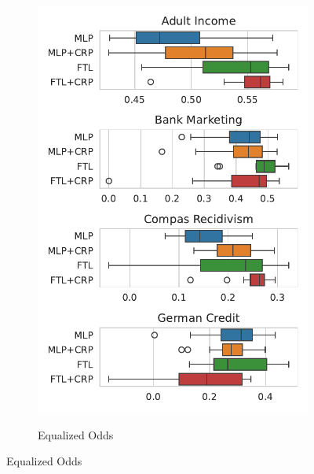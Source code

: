 \begin{figure}[!ht]
\begin{subfigure}{.32\linewidth}
    \includegraphics[width=1\linewidth]{images/boxplot_mcc_opportunity_crp.pdf}
\end{subfigure}
\begin{subfigure}{.32\linewidth}
    \caption{Equalized Odds}
    \label{fig:boxplot_mcc_odds}

\end{subfigure}
\end{figure}
